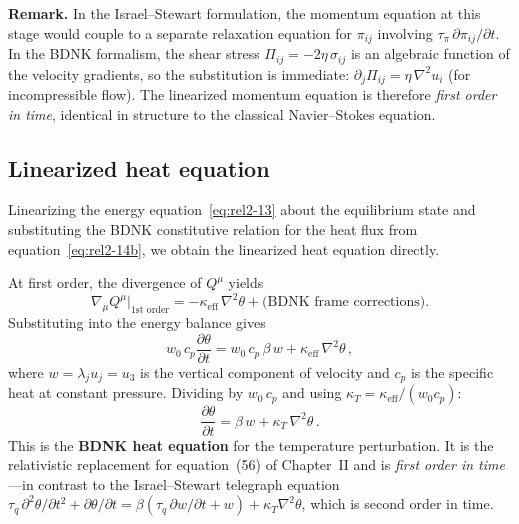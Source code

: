 \medskip
\noindent\textbf{Remark.}\quad
In the Israel--Stewart formulation, the momentum equation at this stage
would couple to a separate relaxation equation for $\pi_{ij}$ involving
$\tau_\pi\,\partial\pi_{ij}/\partial t$.  In the BDNK formalism, the shear
stress $\Pi_{ij} = -2\eta\,\sigma_{ij}$ is an algebraic function of the
velocity gradients, so the substitution is immediate:
$\partial_j \Pi_{ij} = \eta\,\nabla^2 u_i$ (for incompressible flow).
The linearized momentum equation is therefore \emph{first order in time},
identical in structure to the classical Navier--Stokes equation.

\subsection{Linearized heat equation}\label{sec:rel9d}

Linearizing the energy equation~\eqref{eq:rel2-13} about the equilibrium
state and substituting the BDNK constitutive relation for the heat flux
from equation~\eqref{eq:rel2-14b}, we obtain the linearized heat equation
directly.

At first order, the divergence of $Q^\mu$ yields
\begin{equation}
  \nabla_\mu Q^\mu \big|_{\text{1st order}}
  = -\kappa_{\mathrm{eff}}\,\nabla^2\theta + \text{(BDNK frame corrections)}.
\end{equation}
Substituting into the energy balance gives
\begin{equation}
\label{eq:rel2-34}
  w_0\,c_p\frac{\partial\theta}{\partial t}
  = w_0\,c_p\,\beta\,w
    + \kappa_{\mathrm{eff}}\,\nabla^2\theta\,,
\end{equation}
where $w = \lambda_j u_j = u_3$ is the vertical component of velocity
and $c_p$ is the specific heat at constant pressure.  Dividing by
$w_0\,c_p$ and using $\kappa_T = \kappa_{\mathrm{eff}}/(w_0 c_p)$:
\begin{equation}
\label{eq:rel2-36}
  \boxed{
  \frac{\partial\theta}{\partial t}
  = \beta\,w + \kappa_T\,\nabla^2\theta\,.}
\end{equation}
This is the \textbf{BDNK heat equation} for the temperature perturbation.
It is the relativistic replacement for equation~(56) of Chapter~II and
is \emph{first order in time}---in contrast to the Israel--Stewart
telegraph equation
$\tau_q\,\partial^2\theta/\partial t^2 + \partial\theta/\partial t
= \beta(\tau_q\,\partial w/\partial t + w) + \kappa_T\nabla^2\theta$,
which is second order in time.

